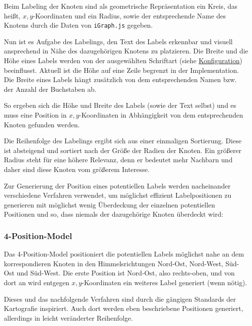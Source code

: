 

Beim Labeling der Knoten sind als geometrische Repräsentation ein Kreis, das heißt, $x,y$-Koordinaten
und ein Radius, sowie der entsprechende Name des Knotens durch die Daten von \texttt{iGraph.js} gegeben.

Nun ist es Aufgabe des Labelings, den Text des Labels erkennbar und visuell ansprechend in Nähe des dazugehörigen Knotens zu platzieren.
Die Breite und die Höhe eines Labels werden von der ausgewählten Schriftart (siehe \hyperref[sec:configuration]{Konfiguration}) beeinflusst.
Aktuell ist die Höhe auf eine Zeile begrenzt in der Implementation.
Die Breite eines Labels hängt zusätzlich von dem entsprechenden Namen bzw. der Anzahl der Buchstaben ab.

So ergeben sich die Höhe und Breite des Labels (sowie der Text selbst) und es muss eine Position in $x,y$-Koordinaten in Abhängigkeit
von dem entsprechenden Knoten gefunden werden.

Die Reihenfolge des Labelings ergibt sich aus einer einmaligen Sortierung.
Diese ist absteigend und sortiert nach der Größe der Radien der Knoten.
Ein größerer Radius steht für eine höhere Relevanz, denn er bedeutet mehr Nachbarn und daher sind diese Knoten vom größerem Interesse.

Zur Generierung der Position eines potentiellen Labels werden nacheinander verschiedene Verfahren verwendet, um möglichst effizient Labelpositionen zu generieren
mit möglichst wenig Überdeckung der einzelnen potentiellen Positionen und so, dass niemals der dazugehörige Knoten überdeckt wird:

\subsubsection{4-Position-Model}
\label{subsubsec:4pos}
Das 4-Position-Model positioniert die potentiellen Labels möglichst nahe an dem korrespondieren Knoten in den Himmelsrichtungen Nord-Ost, Nord-West, Süd-Ost und Süd-West.
Die erste Position ist Nord-Ost, also rechts-oben, und von dort an wird entgegen $x,y$-Koordinaten ein weiteres Label generiert (wenn nötig).

Dieses und das nachfolgende Verfahren sind durch die gängigen Standards der Kartografie inspiriert. Auch dort werden eben beschriebene
Positionen generiert, allerdings in leicht veränderter Reihenfolge.\cite{cartography}

